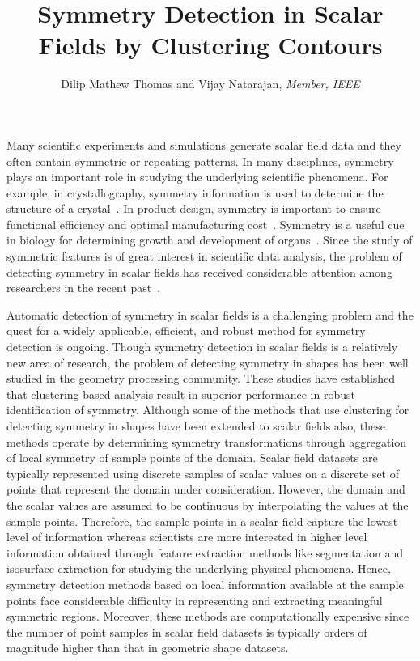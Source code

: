 \documentclass[review,journal]{vgtc}         %
\title{Symmetry Detection in Scalar Fields by Clustering Contours}
\author{Dilip Mathew Thomas and Vijay Natarajan, \textit{Member, IEEE}}
\begin{document}

\maketitle
Many scientific experiments and simulations generate scalar field data and 
they often contain symmetric or repeating patterns. In many disciplines, 
symmetry plays an important role in studying the underlying scientific phenomena. 
For example, in crystallography, symmetry information is used to determine 
the structure of a crystal~\cite{som07}. In product design, symmetry is important 
to ensure functional efficiency and optimal manufacturing cost~\cite{booth02}. Symmetry is a 
useful cue in biology for determining growth and development of organs~\cite{stev06}. Since 
the study of symmetric features is of great interest in scientific data 
analysis, the problem of detecting symmetry in scalar fields has received 
considerable attention among researchers in the recent past~\cite{ThomN11,HongS08,KerbWKS11,ThomN13,MasoodTN13}.

Automatic detection of symmetry in scalar fields is a challenging problem and 
the quest for a widely applicable, efficient, and robust method for symmetry 
detection is ongoing. Though symmetry detection in scalar
fields is a relatively new area of research, the problem of detecting symmetry
in shapes has been well studied in the geometry processing community.
These studies have established that clustering based analysis result in superior
performance in robust identification of symmetry. Although some of the methods
that use clustering for detecting symmetry in shapes have been extended to
scalar fields also, these methods operate by determining symmetry
transformations through aggregation of local symmetry of sample points of the
domain. Scalar field datasets are typically represented using discrete samples
of scalar values on a discrete set of points that represent the domain under 
consideration. However, the domain and the scalar values are assumed to be continuous by
interpolating the values at the sample points. Therefore, the sample points in a scalar 
field capture the lowest level of information whereas scientists are more interested
in higher level information obtained through feature extraction methods like segmentation
and isosurface extraction for studying the underlying physical phenomena. Hence, symmetry
detection methods based on local information available at the sample points
face considerable difficulty in representing and extracting meaningful symmetric 
regions. Moreover, these methods are computationally expensive since the number
of point samples in scalar field datasets is typically orders of magnitude
higher than that in geometric shape datasets.
\end{document}
